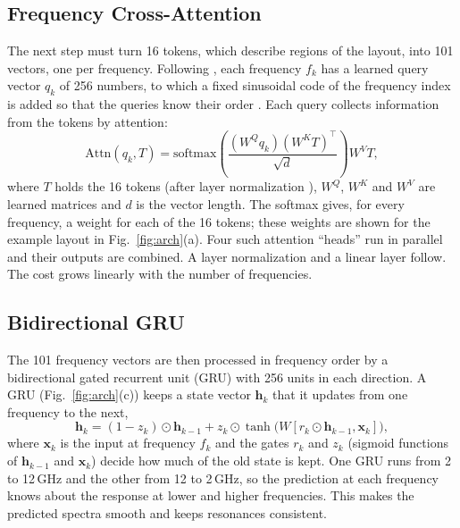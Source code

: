 \documentclass[journal]{IEEEtran}
\begin{document}
\subsection{Frequency Cross-Attention}
The next step must turn 16 tokens, which describe regions of the layout, into 101 vectors, one per frequency. Following \cite{edgeaware}, each frequency $f_k$ has a learned query vector $q_k$ of 256 numbers, to which a fixed sinusoidal code of the frequency index is added so that the queries know their order \cite{vaswani}. Each query collects information from the tokens by attention:
\begin{equation}
\mathrm{Attn}(q_k,T)=\mathrm{softmax}\!\left(\frac{(W^{Q}q_k)(W^{K}T)^{\top}}{\sqrt{d}}\right)W^{V}T,
\end{equation}
where $T$ holds the 16 tokens (after layer normalization \cite{layernorm}), $W^Q$, $W^K$ and $W^V$ are learned matrices and $d$ is the vector length. The softmax gives, for every frequency, a weight for each of the 16 tokens; these weights are shown for the example layout in Fig.~\ref{fig:arch}(a). Four such attention ``heads'' run in parallel and their outputs are combined. A layer normalization and a linear layer follow. The cost grows linearly with the number of frequencies.

\subsection{Bidirectional GRU}
The 101 frequency vectors are then processed in frequency order by a bidirectional gated recurrent unit (GRU) \cite{gru} with 256 units in each direction. A GRU (Fig.~\ref{fig:arch}(c)) keeps a state vector $\mathbf h_k$ that it updates from one frequency to the next,
\begin{equation}
\mathbf h_k=(1-z_k)\odot\mathbf h_{k-1}+z_k\odot\tanh\!\big(W[r_k\odot\mathbf h_{k-1},\mathbf x_k]\big),
\end{equation}
where $\mathbf x_k$ is the input at frequency $f_k$ and the gates $r_k$ and $z_k$ (sigmoid functions of $\mathbf h_{k-1}$ and $\mathbf x_k$) decide how much of the old state is kept. One GRU runs from 2 to 12\,GHz and the other from 12 to 2\,GHz, so the prediction at each frequency knows about the response at lower and higher frequencies. This makes the predicted spectra smooth and keeps resonances consistent.
\end{document}
